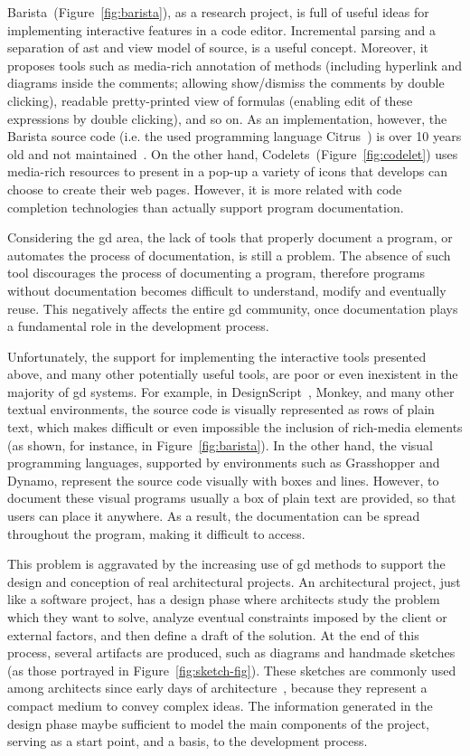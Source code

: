 Barista~(Figure~\ref{fig:barista}), as a research project, is full of useful ideas for implementing interactive features in a code editor. Incremental parsing and a separation of \gls{ast} and view model of source, is a useful concept. Moreover, it proposes tools such as media-rich annotation of methods (including hyperlink and diagrams inside the comments; allowing show/dismiss the comments by double clicking), readable pretty-printed view of formulas (enabling edit of these expressions by double clicking), and so on. As an implementation, however, the Barista source code (i.e. the used programming language Citrus~\citep{ko2005citrus}) is over 10 years old and not maintained~\citep{contact:ko2006barista}. On the other hand, Codelets~(Figure~\ref{fig:codelet}) uses media-rich resources to present in a pop-up a variety of icons that develops can choose to create their web pages. However, it is more related with code completion technologies than actually support program documentation.

Considering the \gls{gd} area, the lack of tools that properly document a program, or automates the process of documentation, is still a problem. The absence of such tool discourages the process of documenting a program, therefore programs without documentation becomes difficult to understand, modify and eventually reuse. This negatively affects the entire \gls{gd} community, once documentation plays a fundamental role in the development process. 

Unfortunately, the support for implementing the interactive tools presented above, and many other potentially useful tools, are poor or even inexistent in the majority of \gls{gd} systems. For example, in DesignScript~\citep{aish2012designscript}, Monkey, and many other textual environments, the source code is visually represented as rows of plain text, which makes difficult or even impossible the inclusion of rich-media elements (as shown, for instance, in Figure~\ref{fig:barista}). In the other hand, the visual programming languages, supported by environments such as Grasshopper and Dynamo, represent the source code visually with boxes and lines. However, to document these visual programs usually a box of plain text are provided, so that users can place it anywhere. As a result, the documentation can be spread throughout the program, making it difficult to access.

This problem is aggravated by the increasing use of \gls{gd} methods to support the design and conception of real architectural projects. An architectural project, just like a software project, has a design phase where architects study the problem which they want to solve, analyze eventual constraints imposed by the client or external factors, and then define a draft of the solution. At the end of this process, several artifacts are produced, such as diagrams and handmade sketches (as those portrayed in Figure~\ref{fig:sketch-fig}). These sketches are commonly used among architects since early days of architecture~\citep{do2001thinking}, because they represent a compact medium to convey complex ideas. The information generated in the design phase maybe sufficient to model the main components of the project, serving as a start point, and a basis, to the development process. 

